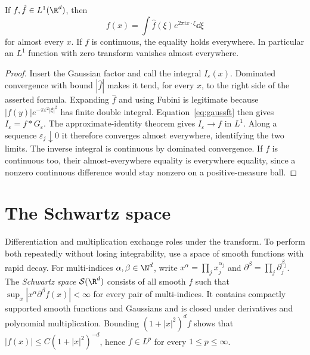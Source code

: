 \begin{theorem}\label{thm:ftinv}
If $f,\hat f\in L^1(\R^d)$, then
\[
f(x)=\int\hat f(\xi)e^{2\pi ix\cdot\xi}\dd\xi
\]
for almost every $x$. If $f$ is continuous, the equality holds everywhere. In particular an $L^1$ function with zero transform vanishes almost everywhere.
\end{theorem}
\begin{proof}
Insert the Gaussian factor and call the integral $I_\varepsilon(x)$. Dominated convergence with bound $|\hat f|$ makes it tend, for every $x$, to the right side of the asserted formula. Expanding $\hat f$ and using Fubini is legitimate because $|f(y)|e^{-\pi\varepsilon^2|\xi|^2}$ has finite double integral. Equation~\eqref{eq:gaussft} then gives $I_\varepsilon=f*G_\varepsilon$.
The approximate-identity theorem gives $I_\varepsilon\to f$ in $L^1$. Along a sequence $\varepsilon_j\downarrow0$ it therefore converges almost everywhere, identifying the two limits. The inverse integral is continuous by dominated convergence. If $f$ is continuous too, their almost-everywhere equality is everywhere equality, since a nonzero continuous difference would stay nonzero on a positive-measure ball.
\end{proof}

\section{The Schwartz space}

Differentiation and multiplication exchange roles under the transform. To perform both repeatedly without losing integrability, use a space of smooth functions with rapid decay. For multi-indices $\alpha,\beta\in\N^d$, write $x^\alpha=\prod_jx_j^{\alpha_j}$ and $\partial^\beta=\prod_j\partial_j^{\beta_j}$. The \emph{Schwartz space} $\mathcal S(\R^d)$ consists of all smooth $f$ such that $\sup_x|x^\alpha\partial^\beta f(x)|<\infty$ for every pair of multi-indices. It contains compactly supported smooth functions and Gaussians and is closed under derivatives and polynomial multiplication. Bounding $(1+|x|^2)^df$ shows that $|f(x)|\le C(1+|x|^2)^{-d}$, hence $f\in L^p$ for every $1\le p\le\infty$.

